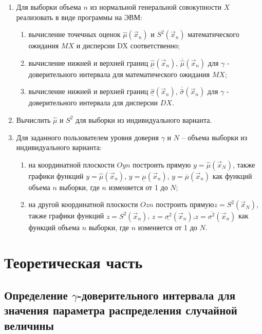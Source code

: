 \documentclass[a4paper,14pt, unknownkeysallowed]{extreport}
\begin{document}
\begin{enumerate}
    \item Для выборки объема $n$ из нормальной генеральной совокупности $X$ реализовать в виде программы на ЭВМ:

    \begin{enumerate}
        \item вычисление точечных оценок $\hat\mu (\vec x_n)$ и $S^2 (\vec x_n)$ математического ожидания $MX$ и дисперсии DX соответственно;
        \item вычисление нижней и верхней границ $\underline{\hat\mu} (\vec x_n)$, $\overline{\hat\mu} (\vec x_n)$ для $\gamma$ - доверительного интервала для математического ожидания $MX$;
        \item вычисление нижней и верхней границ $\underline{\hat\sigma} (\vec x_n)$, $\overline{\hat\sigma} (\vec x_n)$ для $\gamma$ - доверительного интервала для дисперсии $DX$.
    \end{enumerate}

    \item Вычислить $\hat\mu$ и $S^2$ для выборки из индивидуального варианта.
    \item Для заданного пользователем уровня доверия $\gamma$ и $N$ -- объема выборки из индивидуального варианта:
    
	\begin{enumerate}
        \item на координатной плоскости $Oyn$ построить прямую $y = {\hat\mu} (\vec x_N)$, также графики функций $y = {\hat\mu} (\vec x_n)$, $y = \underline{\mu} (\vec x_n)$, $y = \overline{\mu} (\vec x_n)$ как функций объема $n$ выборки, где $n$ изменяется от 1 до $N$;
        \item на другой координатной плоскости $Ozn$ построить прямую\newline $z = S^2 (\vec x_N)$, также графики функций $z = S^2 (\vec x_n)$, $z = \underline{\sigma^2} (\vec x_n)$,\newline $z = \overline{\sigma^2} (\vec x_n)$ как функций объема $n$ выборки, где $n$ изменяется от 1 до $N$.
    \end{enumerate}

\end{enumerate}

\chapter{Теоретическая часть}

\section{Определение $\gamma$-доверительного интервала для значения параметра распределения случайной величины}
\end{document}
